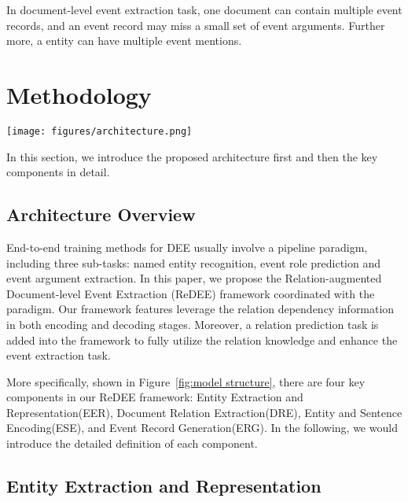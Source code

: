 \documentclass[11pt]{article}
\begin{document}
In document-level event extraction task, one document can contain multiple event records, and an event record may miss a small set of event arguments. Further more, a entity can have multiple event mentions.


\section{Methodology}

\begin{figure*}
    \centering
    \texttt{[image: figures/architecture.png]}
    \caption{Overall of our proposed ReDEE framework.}
    \label{fig:model structure}
\end{figure*}

In this section, we introduce the proposed architecture first and then the key components in detail. 

\subsection{Architecture Overview}

End-to-end training methods for DEE usually involve a pipeline paradigm, including three sub-tasks: named entity recognition, event role prediction and event argument extraction. In this paper, we propose the Relation-augmented Document-level Event Extraction (ReDEE) framework coordinated with the paradigm. Our framework features leverage the relation dependency information in both encoding and decoding stages. Moreover, a relation prediction task is added into the framework to fully utilize the relation knowledge and enhance the event extraction task.

More specifically, shown in Figure~\ref{fig:model structure}, there are four key components in our ReDEE framework: Entity Extraction and Representation(EER), Document Relation Extraction(DRE), Entity and Sentence Encoding(ESE), and Event Record Generation(ERG). In the following, we would introduce the detailed definition of each component.



\subsection{Entity Extraction and Representation}
\end{document}
